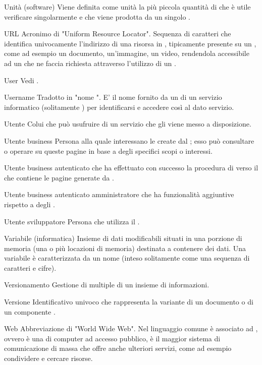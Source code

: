 \elemento
{Unità (software)}
{Viene definita come unità la più piccola quantità di  che è utile verificare singolarmente e che viene prodotta da un singolo .}

\elemento
{URL}
{Acronimo di "Uniform Resource Locator". Sequenza di caratteri che identifica univocamente l'indirizzo di una risorsa in , tipicamente presente su un  , come ad esempio un documento, un'immagine, un video, rendendola accessibile ad un  che ne faccia richiesta attraverso l'utilizzo di un  .}

\elemento
{User}
{Vedi .}

\elemento
{Username}
{Tradotto in "nome ". E' il nome fornito da un  di un servizio informatico (solitamente ) per identificarsi e accedere così al dato servizio.}

\elemento
{Utente}
{Colui che può usufruire di un servizio che gli viene messo a disposizione.}

\elemento
{Utente business}
{Persona alla quale interessano le  create dal  ; esso può consultare o operare su queste pagine in base a degli specifici scopi o interessi.}

\elemento
{Utente business autenticato}
{ che ha effettuato con successo la procedura di  verso il  che contiene le pagine generate da .}

\elemento
{Utente business autenticato amministratore}
{ che ha funzionalità aggiuntive rispetto a degli .}

\elemento
{Utente sviluppatore}
{Persona che utilizza il  .}


\elemento
{Variabile (informatica)}
{Insieme di dati modificabili situati in una porzione di memoria (una o più locazioni di memoria) destinata a contenere dei dati. Una variabile è caratterizzata da un nome (inteso solitamente come una sequenza di caratteri e cifre).}

\elemento
{Versionamento}
{Gestione di  multiple di un insieme di informazioni.}

\elemento
{Versione}
{Identificativo univoco che rappresenta la variante di un documento o di un componente .}



\elemento
{Web}
{Abbreviazione di "World Wide Web". Nel linguaggio comune è associato ad , ovvero è una   di computer ad accesso pubblico, è il maggior sistema di comunicazione di massa che offre anche ulteriori servizi, come ad esempio condividere e cercare risorse.}
